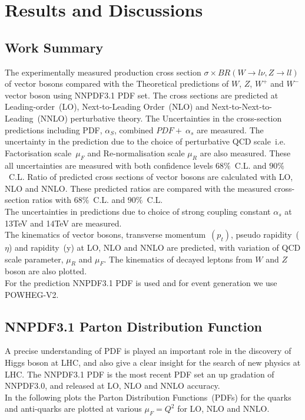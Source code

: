 \documentclass[a4paper,12pt]{report}
\numberwithin{equation}{section}
\begin{document}
\chapter{Results and Discussions}
\section{Work Summary}
The experimentally measured production cross section $ \sigma \times BR(W \rightarrow l \nu,Z \rightarrow ll)$ of vector bosons compared with the Theoretical predictions of $W$, $Z$, $W^{+}$ and $W^{-}$ vector boson using NNPDF3.1 PDF set. The cross sections are predicted at Leading-order~(LO), Next-to-Leading Order~(NLO) and Next-to-Next-to-Leading~(NNLO) perturbative theory. The Uncertainties in the cross-section predictions including PDF, $\alpha_{S}$, combined $PDF+~\alpha_{s}$ are measured. The uncertainty in the prediction due to the choice of perturbative QCD scale~i.e. Factorisation scale~$\mu_{F}$ and Re-normalisation scale $\mu_{R}$ are also measured. These all uncertainties are measured with both confidence levels $68\%$~C.L. and $90\%$~C.L. Ratio of predicted cross sections of vector bosons are calculated with LO, NLO and NNLO. These predicted ratios are compared with the measured cross-section ratios with $68\%$~C.L. and $90\%$~C.L.\\
The uncertainties in predictions due to choice of strong coupling constant $\alpha_{s}$ at 13TeV and 14TeV are measured.\\
The kinematics of vector bosons, transverse momentum~$(p_{t})$, pseudo rapidity~($\eta$) and rapidity~(y) at LO, NLO and NNLO are predicted, with variation of QCD scale parameter, $\mu_{R}$ and $\mu_{F}$. The kinematics of decayed leptons from $W$ and $Z$ boson are also plotted.\\
For the prediction NNPDF3.1  PDF is used and for event generation we use POWHEG-V2.
\section{NNPDF3.1 Parton Distribution Function}
A precise understanding of PDF is played an important role in the discovery of Higgs boson at LHC, and also give a clear insight for the search of new physics at LHC. The NNPDF3.1 PDF is the most recent PDF set an up gradation of NNPDF3.0, and released at LO, NLO and NNLO accuracy.\\
In the following plots the Parton Distribution Functions~(PDFs) for the quarks and anti-quarks are plotted at various $\mu_{F}=Q^{2}$ for LO, NLO and NNLO.
\end{document}
